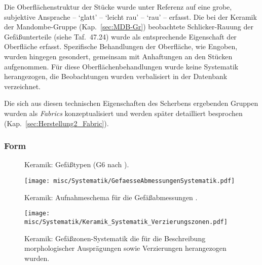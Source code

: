 Die Oberflächenstruktur der Stücke wurde unter Referenz auf eine grobe, subjektive Ansprache -- \enquote*{glatt} -- \enquote*{leicht rau} -- \enquote*{rau} -- erfasst. Die bei der Keramik der Mandombe-Gruppe (Kap.~\ref{sec:MDB-Gr}) beobachtete Schlicker-Rauung der Gefäßunterteile (siehe Taf.~47.24) wurde als entsprechende Eigenschaft der Oberfläche erfasst. Spezifische Behandlungen der Oberfläche, wie Engoben, wurden hingegen gesondert, gemeinsam mit Anhaftungen an den Stücken aufgenommen. Für diese Oberflächenbehandlungen wurde keine Systematik herangezogen, die Beobachtungen wurden verbalisiert in der Datenbank verzeichnet.

Die sich aus diesen technischen Eigenschaften des Scherbens ergebenden Gruppen wurden als \textit{Fabrics} konzeptualisiert und werden später detailliert besprochen (Kap.~\ref{sec:Herstellung2_Fabric}).

\subsubsection{Form}

\begin{figure*}[!tb]
	\centering
	\resizebox{\textwidth}{!}{%
		}
	\caption{Keramik: Gefäßtypen (G6 nach \cite[Taf.~XII.175]{Coart.1907}).}
	\label{tab:Keramik_GefFormen}
\end{figure*}

\begin{figure*}[p]
	\centering
	\texttt{[image: misc/Systematik/GefaesseAbmessungenSystematik.pdf]}
	\caption{Keramik: Aufnahmeschema für die Gefäßabmessungen \parencite[nach][siehe Abb.~\ref{fig:DB-Schema} für die Attributnamen]{Wicke.2011}.}
	\label{fig:GefAbmessungen_Schema}
\end{figure*}

\begin{figure*}[p]
	\centering
	\texttt{[image: misc/Systematik/Keramik\_Systematik\_Verzierungszonen.pdf]}
	\caption{Keramik: Gefäßzonen-Systematik die für die Beschreibung morphologischer Ausprägungen sowie Verzierungen herangezogen wurden.}
	\label{fig:Keramik_VerzZonen}
\end{figure*}


